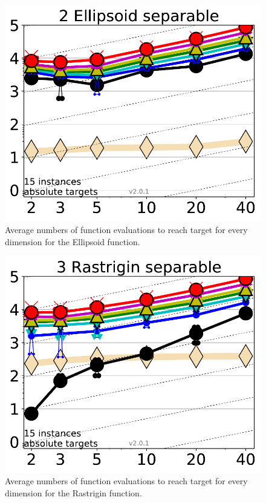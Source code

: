 \begin{figure}[h!tbp]
    \centering
        \includegraphics[width=5in]{img/Ellipsoid.pdf}
    \caption{Average numbers of function evaluations to reach target
      for every dimension for the Ellipsoid function.}
    \label{fig:ellipsoid}
\end{figure}

\begin{figure}[h!tbp]
    \centering
        \includegraphics[width=5in]{img/Rastrigin.pdf}
    \caption{Average numbers of function evaluations to reach target
      for every dimension for the Rastrigin function.}
    \label{fig:rastrigin}
\end{figure}


